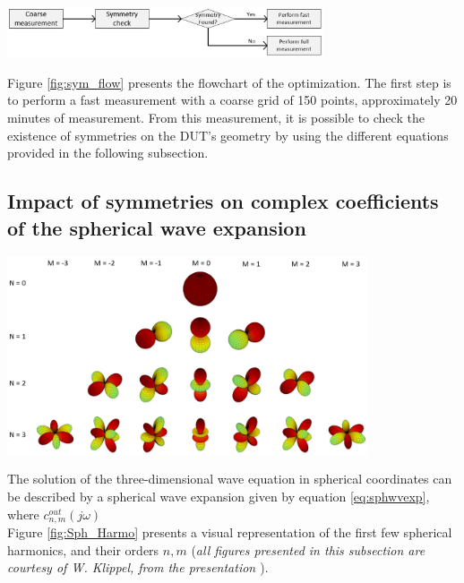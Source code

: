 \documentclass{report}
\begin{document}
\begin{center}
	\includegraphics[width=0.7\textwidth]{Sym/flowchart} 
    \captionsetup{hypcap=false} 
	\label{fig:sym_flow}
\end{center}

Figure \ref{fig:sym_flow} presents the flowchart of the optimization. The first step is to perform a fast measurement with a coarse grid of 150 points, approximately 20 minutes of measurement. From this measurement, it is possible to check the existence of symmetries on the DUT's geometry by using the different equations provided in the following subsection. 

\subsection{Impact of symmetries on complex coefficients of the spherical wave expansion}
\label{chap:sym}

\begin{minipage}{0.5\textwidth}
\begin{center}
	\includegraphics[width=0.8\textwidth]{Appendix/Spherical_Harmo}
    \captionsetup{hypcap=false}
    \label{fig:Sph_Harmo}
\end{center}
\end{minipage}
\begin{minipage}{0.5\textwidth}
The solution of the three-dimensional wave equation in spherical coordinates can be described by a spherical wave expansion given by equation \ref{eq:sphwvexp}, where $c_{n,m}^{out}(j \omega)$ \\

Figure \ref{fig:Sph_Harmo} presents a visual representation of the first few spherical harmonics, and their orders $n,m$ (\textit{all figures presented in this subsection are courtesy of W. Klippel, from the presentation \cite{lect2018}}). 
\end{minipage}
\vspace{0.4cm}
\end{document}
